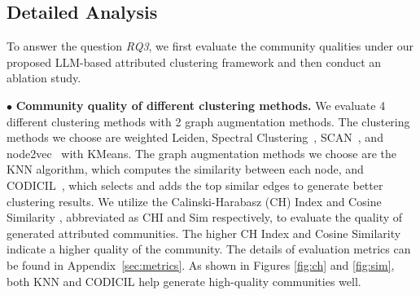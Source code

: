 \topkmultihop
{}\topkhotpot


\subsection{Detailed Analysis}

To answer the question {\it RQ3}, we first evaluate the community qualities under our proposed LLM-based attributed clustering framework and then conduct an ablation study.



$\bullet$ \textbf{Community quality of different clustering methods.} We evaluate 4 different clustering methods with 2 graph augmentation methods. The clustering methods we choose are weighted Leiden, Spectral Clustering~\cite{von2007tutorial}, SCAN~\cite{xu2007scan}, and node2vec~\cite{grover2016node2vec} with KMeans. 
%
The graph augmentation methods we choose are the KNN algorithm, which computes the similarity between each node, and CODICIL~\cite{CODICIL2013efficient}, which selects and adds the top similar edges to generate better clustering results. 
%
We utilize the Calinski-Harabasz (CH) Index \cite{calinski1974CHIndex} and Cosine Similarity \cite{charikar2002similarity}, abbreviated as CHI and Sim respectively, to evaluate the quality of generated attributed communities. 
%
The higher CH Index and Cosine Similarity indicate a higher quality of the community. The details of evaluation metrics can be found in Appendix~\ref{sec:metrics}.
%
As shown in Figures \ref{fig:ch} and \ref{fig:sim}, both KNN and CODICIL help generate high-quality communities well.

